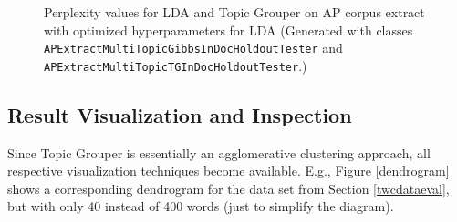 \documentclass[10pt, a4paper, oneside]{article}
\begin{document}
\begin{figure}
\caption{Perplexity values for LDA and Topic Grouper on AP corpus extract with optimized hyperparameters for LDA (Generated with classes \texttt{APExtractMultiTopicGibbsInDocHoldoutTester} and \texttt{APExtractMultiTopicTGInDocHoldoutTester}.)}
\label{perplexity7}
\end{figure}

\subsection{Result Visualization and Inspection}

Since Topic Grouper is essentially an agglomerative clustering approach, all respective visualization techniques become available.
E.g., Figure \ref{dendrogram} shows a corresponding dendrogram for the data set from Section \ref{twcdataeval}, but with only 40 instead of 400 words (just to simplify the diagram).
 
\end{document}
